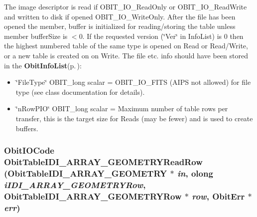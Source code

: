 The image descriptor is read if OBIT\_\-IO\_\-Read\-Only or OBIT\_\-IO\_\-Read\-Write and written to disk if opened OBIT\_\-IO\_\-Write\-Only. After the file has been opened the member, buffer is initialized for reading/storing the table unless member buffer\-Size is $<$0. If the requested version (\char`\"{}Ver\char`\"{} in Info\-List) is 0 then the highest numbered table of the same type is opened on Read or Read/Write, or a new table is created on on Write. The file etc. info should have been stored in the {\bf Obit\-Info\-List}{\rm (p.\,\pageref{structObitInfoList})}: \begin{itemize}
\item \char`\"{}File\-Type\char`\"{} OBIT\_\-long scalar = OBIT\_\-IO\_\-FITS (AIPS not allowed) for file type (see class documentation for details). \item \char`\"{}n\-Row\-PIO\char`\"{} OBIT\_\-long scalar = Maximum number of table rows per transfer, this is the target size for Reads (may be fewer) and is used to create buffers. 
\end{itemize}
\subsubsection{\setlength{\rightskip}{0pt plus 5cm}Obit\-IOCode Obit\-Table\-IDI\_\-ARRAY\_\-GEOMETRYRead\-Row ({\bf Obit\-Table\-IDI\_\-ARRAY\_\-GEOMETRY} $\ast$ {\em in}, {\bf olong} {\em i\-IDI\_\-ARRAY\_\-GEOMETRYRow}, {\bf Obit\-Table\-IDI\_\-ARRAY\_\-GEOMETRYRow} $\ast$ {\em row}, {\bf Obit\-Err} $\ast$ {\em err})}\label{ObitTableIDI__ARRAY__GEOMETRY_8h_a18}


